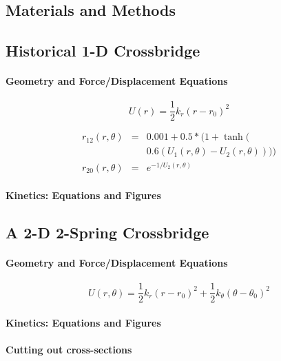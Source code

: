 \documentclass[11pt]{article}
\begin{document}
\begin{multicols}{2}
\section*{Materials and Methods}



\subsection*{Historical 1-D Crossbridge}
\paragraph*{Geometry and Force/Displacement Equations}

\begin{equation}
U(r)=\frac{1}{2}k_r (r-r_0)^2
\end{equation}

\begin{eqnarray}  
	r_{12}(r, \theta) & = & 0.001 + 0.5 * (1 + \tanh( \nonumber \\
				&   & 0.6 (U_1(r, \theta) - U_2(r, \theta)))) \\
	r_{20}(r, \theta) & = & e^{-1 / U_2(r, \theta)}
\end{eqnarray} 
 
\paragraph*{Kinetics: Equations and Figures}

\subsection*{A 2-D 2-Spring Crossbridge}

\paragraph*{Geometry and Force/Displacement Equations}

\begin{equation}
U(r,\theta)=\frac{1}{2}k_r (r-r_0)^2+\frac{1}{2}k_\theta (\theta-\theta_0)^2
\end{equation}

\paragraph*{Kinetics: Equations and Figures}

\paragraph*{Cutting out cross-sections}


\end{multicols}
\end{document}
